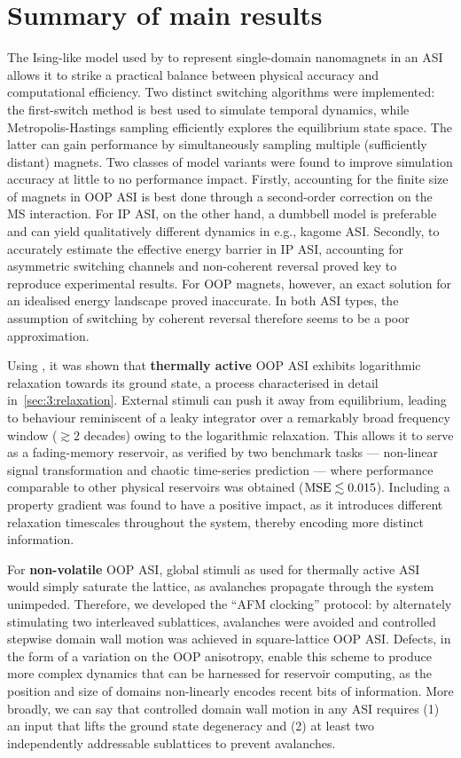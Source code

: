\section{Summary of main results}
The Ising-like model used by \textbf{\hotspice} to represent single-domain nanomagnets in an ASI allows it to strike a practical balance between physical accuracy and computational efficiency.
Two distinct switching algorithms were implemented: the first-switch method is best used to simulate temporal dynamics, while Metropolis-Hastings sampling efficiently explores the equilibrium state space.
The latter can gain performance by simultaneously sampling multiple (sufficiently distant) magnets.
Two classes of model variants were found to improve simulation accuracy at little to no performance impact.
Firstly, accounting for the finite size of magnets in OOP ASI is best done through a second-order correction on the MS interaction.
For IP ASI, on the other hand, a dumbbell model is preferable and can yield qualitatively different dynamics in e.g., kagome ASI.
Secondly, to accurately estimate the effective energy barrier in IP ASI, accounting for asymmetric switching channels and non-coherent reversal proved key to reproduce experimental results.
For OOP magnets, however, an exact solution for an idealised energy landscape proved inaccurate.
In both ASI types, the assumption of switching by coherent reversal therefore seems to be a poor approximation. \par
Using \hotspice, it was shown that \textbf{thermally active} OOP ASI exhibits logarithmic relaxation towards its ground state, a process characterised in detail in~\cref{sec:3:relaxation}.
External stimuli can push it away from equilibrium, leading to behaviour reminiscent of a leaky integrator over a remarkably broad frequency window ($\gtrsim 2$ decades) owing to the logarithmic relaxation.
This allows it to serve as a fading-memory reservoir, as verified by two benchmark tasks --- non-linear signal transformation and chaotic time-series prediction --- where performance comparable to other physical reservoirs was obtained ($\mathrm{MSE} \lesssim 0.015$).
Including a property gradient was found to have a positive impact, as it introduces different relaxation timescales throughout the system, thereby encoding more distinct information. \par
For \textbf{non-volatile} OOP ASI, global stimuli as used for thermally active ASI would simply saturate the lattice, as avalanches propagate through the system unimpeded.
Therefore, we developed the ``AFM clocking'' protocol: by alternately stimulating two interleaved sublattices, avalanches were avoided and controlled stepwise domain wall motion was achieved in square-lattice OOP ASI.
Defects, in the form of a variation on the OOP anisotropy, enable this scheme to produce more complex dynamics that can be harnessed for reservoir computing, as the position and size of domains non-linearly encodes recent bits of information.
More broadly, we can say that controlled domain wall motion in any ASI requires (1) an input that lifts the ground state degeneracy and (2) at least two independently addressable sublattices to prevent avalanches. \\\par

